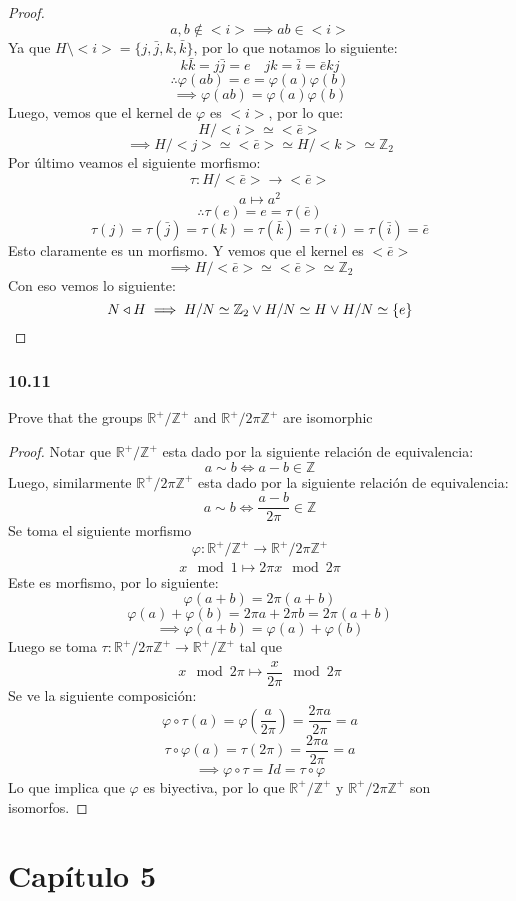 \documentclass[11pt]{article}
\newcommand{\set}[1]{\mathbb{#1}}
\newcommand{\func}[5]{#1:#2\xrightarrow[#5]{#4}#3}
\theoremstyle{definition}
\begin{document}
\begin{proof}
    \[a,b\notin<i>\implies ab\in<i>\]
    Ya que $H\setminus<i>=\{j,\bar{j},k,\bar{k}\}$, por lo que notamos lo siguiente:
    \[k\bar{k}=j\bar{j}=e\quad jk=\bar{i}=\bar{e}kj\]
    \[\therefore\varphi(ab)=e=\varphi(a)\varphi(b)\]
    \[\implies \varphi(ab)=\varphi(a)\varphi(b)\]
    Luego, vemos que el kernel de $\varphi$ es $<i>$, por lo que:
    \[H/<i>\simeq <\bar{e}>\]
    \[\implies H/<j>\simeq<\bar{e}>\simeq H/<k>\simeq\set{Z}_2\]
    Por último veamos el siguiente morfismo:
    \[\func{\tau}{H/<\bar{e}>}{<\bar{e}>}{}{}\]
    \[a\mapsto a^2\]
    \[\therefore\tau(e)=e=\tau(\bar{e})\]
    \[\tau(j)=\tau(\bar{j})=\tau(k)=\tau(\bar{k})=\tau(i)=\tau(\bar{i})=\bar{e}\]
    Esto claramente es un morfismo. Y vemos que el kernel es $<\bar{e}>$
    \[\implies H/<\bar{e}>\simeq <\bar{e}>\simeq\set{Z}_2\]
    Con eso vemos lo siguiente:
    \[N\triangleleft H\implies H/N\simeq\set{Z}_2\vee H/N\simeq H\vee H/N\simeq \{e\}\qedhere\]
\end{proof}

\subsubsection{10.11}
Prove that the groups $\set{R}^+/\set{Z}^+$ and $\set{R}^+/2\pi\set{Z}^+$ are isomorphic
\begin{proof}
    Notar que $\set{R}^+/\set{Z}^+$ esta dado por la siguiente relación de equivalencia:
    \[a\sim b\iff a-b\in\set{Z}\]
    Luego, similarmente $\set{R}^+/2\pi\set{Z}^+$ esta dado por la siguiente relación de equivalencia:
    \[a\sim b\iff \frac{a-b}{2\pi}\in\set{Z}\]
    Se toma el siguiente morfismo
    \[\func{\varphi}{\set{R}^+/\set{Z}^+}{\set{R}^+/2\pi\set{Z}^+}{}{}\]
    \[x\mod 1\mapsto 2\pi x\mod 2\pi\]
    Este es morfismo, por lo siguiente:
    \[\varphi(a+b)=2\pi(a+b)\]
    \[\varphi(a)+\varphi(b)=2\pi a+2\pi b=2\pi (a+b)\]
    \[\implies \varphi(a+b)=\varphi(a)+\varphi(b)\]
    Luego se toma $\func{\tau}{\set{R}^+/2\pi\set{Z}^+}{\set{R}^+/\set{Z}^+}{}{}$ tal que
    \[x\mod 2\pi\mapsto \frac{x}{2\pi}\mod 2\pi\]
    Se ve la siguiente composición:
    \[\varphi\circ\tau(a)=\varphi\left(\frac{a}{2\pi}\right)=\frac{2\pi a}{2\pi}=a\]
    \[\tau\circ\varphi(a)=\tau(2\pi)=\frac{2\pi a}{2\pi}=a\]
    \[\implies \varphi\circ\tau=Id=\tau\circ\varphi\]
    Lo que implica que $\varphi$ es biyectiva, por lo que $\set{R}^+/\set{Z}^+$ y $\set{R}^+/2\pi\set{Z}^+$ son isomorfos.
\end{proof}
\section{Capítulo 5}
\end{document}
